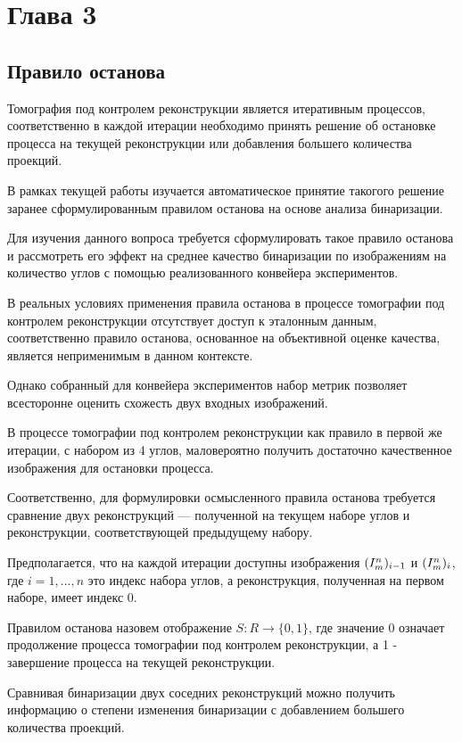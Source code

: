 \section{Глава 3}

\subsection{Правило останова}

Томография под контролем реконструкции является итеративным процессов, соответственно в каждой итерации необходимо принять решение об остановке процесса на текущей реконструкции или добавления большего количества проекций.

В рамках текущей работы изучается автоматическое принятие такогого решение заранее сформулированным правилом останова на основе анализа бинаризации.

Для изучения данного вопроса требуется сформулировать такое правило останова и рассмотреть его эффект на среднее качество бинаризации по изображениям на количество углов с помощью реализованного конвейера экспериментов.

В реальных условиях применения правила останова в процессе томографии под контролем реконструкции отсутствует доступ к эталонным данным, соответственно правило останова, основанное на объективной оценке качества, является неприменимым в данном контексте.

Однако собранный для конвейера экспериментов набор метрик позволяет всесторонне оценить схожесть двух входных изображений.

В процессе томографии под контролем реконструкции как правило в первой же итерации, с набором из 4 углов, маловероятно получить достаточно качественное изображения для остановки процесса. 

Соответственно, для формулировки осмысленного правила останова требуется сравнение двух реконструкций — полученной на текущем наборе углов и реконструкции, соответствующей предыдущему набору. 

Предполагается, что на каждой итерации доступны изображения \((I^n_m)_{i-1}\) и \((I^n_m)_i\), где \(i = 1, ..., n\) это индекс набора углов, а реконструкция, полученная на первом наборе, имеет индекс \(0\).

Правилом останова назовем отображение \(S : R \rightarrow \{0, 1\}\), где значение 0 означает продолжение процесса томографии под контролем реконструкции, а 1 - завершение процесса на текущей реконструкции.

Сравнивая бинаризации двух соседних реконструкций можно получить информацию о степени изменения бинаризации с добавлением большего количества проекций.


